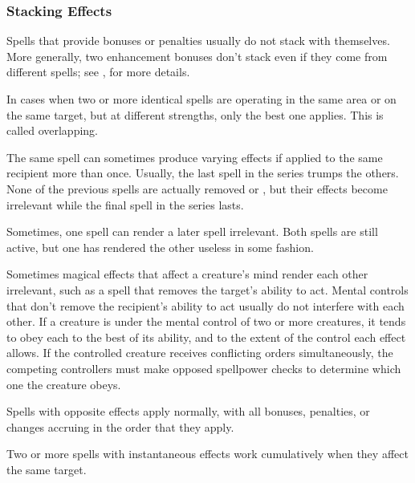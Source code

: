         \subsubsection{Stacking Effects}
            Spells that provide bonuses or penalties usually do not stack with themselves.
            More generally, two enhancement bonuses don't stack even if they come from different spells; see , for more details.

             In cases when two or more identical spells are operating in the same area or on the same target, but at different strengths, only the best one applies.
            This is called overlapping.

             The same spell can sometimes produce varying effects if applied to the same recipient more than once.
            Usually, the last spell in the series trumps the others.
            None of the previous spells are actually removed or , but their effects become irrelevant while the final spell in the series lasts.

             Sometimes, one spell can render a later spell irrelevant.
            Both spells are still active, but one has rendered the other useless in some fashion.

             Sometimes magical effects that affect a creature's mind render each other irrelevant, such as a spell that removes the target's ability to act.
            Mental controls that don't remove the recipient's ability to act usually do not interfere with each other.
            If a creature is under the mental control of two or more creatures, it tends to obey each to the best of its ability, and to the extent of the control each effect allows.
            If the controlled creature receives conflicting orders simultaneously, the competing controllers must make opposed spellpower checks to determine which one the creature obeys.

             Spells with opposite effects apply normally, with all bonuses, penalties, or changes accruing in the order that they apply.

             Two or more spells with instantaneous effects work cumulatively when they affect the same target.

